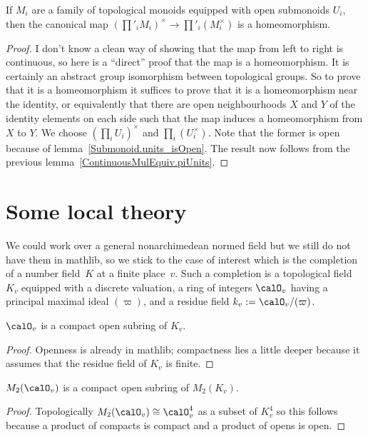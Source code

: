 \begin{theorem}
  \label{ContinuousMulEquiv.restrictedProductUnits}
  \leanok
  If $M_i$ are a family of topological monoids equipped with open
  submonoids $U_i$, then the canonical map $(\prod'_iM_i)^\times\to\prod'_i(M_i^\times)$
  is a homeomorphism.
\end{theorem}
\begin{proof}
  I don't know a clean way of showing that the map from left to right is continuous,
  so here is a ``direct'' proof that the map is a homeomorphism. It is certainly an abstract group
  isomorphism between topological groups. So to prove that it is a homeomorphism it suffices
  to prove that it is a homeomorphism near the identity, or equivalently that there are open
  neighbourhoods $X$ and $Y$ of the identity elements on each side such that the map induces a
  homeomorphism from $X$ to $Y$. We choose $(\prod_i U_i)^\times$ and $\prod_i (U_i^\times)$.
  Note that the former is open because of lemma~\ref{Submonoid.units_isOpen}.
  The result now follows from the previous lemma~\ref{ContinuousMulEquiv.piUnits}.
\end{proof}

\section{Some local theory}

We could work over a general nonarchimedean normed field but we still do not have them
in mathlib, so we stick to the case of interest which is the completion of a number
field~$K$ at a finite place~$v$. Such a completion is a topological field~$K_v$
equipped with a discrete valuation, a ring of integers $\calO_v$ having a principal
maximal ideal $(\varpi)$, and a residue field $k_v:=\calO_v/(\varpi)$.

\begin{lemma} $\calO_v$ is a compact open subring of $K_v$.
\end{lemma}
\begin{proof} Openness is already in mathlib; compactness lies a little deeper because it
  assumes that the residue field of $K_v$ is finite.
\end{proof}

\begin{lemma} $M_2(\calO_v)$ is a compact open subring of $M_2(K_v)$.
\end{lemma}
\begin{proof} Topologically $M_2(\calO_v)\cong \calO_v^4$ as a subset of $K_v^4$ so this
  follows because a product of compacts is compact and a product of opens is open.
\end{proof}

